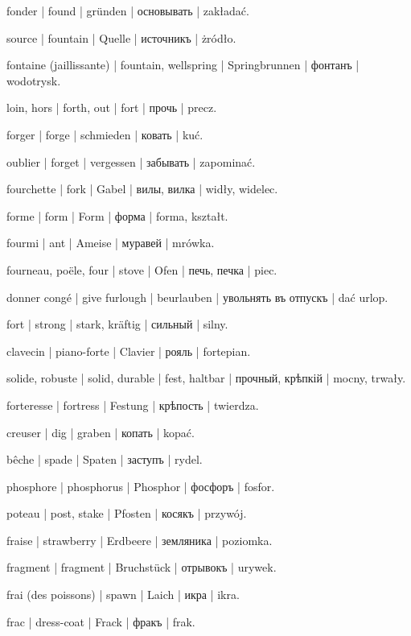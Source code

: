\begin{outdent}{1em}
fonder | found | gründen | основывать | zakładać.

source | fountain | Quelle | источникъ | żródło.

fontaine (jaillissante) | fountain, wellspring | Springbrunnen | фонтанъ | wodotrysk.

loin, hors | forth, out | fort | прочь | precz.

forger | forge | schmieden | ковать | kuć.

oublier | forget | vergessen | забывать | zapominać.

fourchette | fork | Gabel | вилы, вилка | widły, widelec.

forme | form | Form | форма | forma, kształt.

fourmi | ant | Ameise | муравей | mrówka.

fourneau, poële, four | stove | Ofen | печь, печка | piec.

donner congé | give furlough | beurlauben | увольнять въ
отпускъ | dać urlop.

fort | strong | stark, kräftig | сильный | silny.

clavecin | piano-forte | Clavier | рояль | fortepian.

solide, robuste | solid, durable | fest, haltbar | прочный,
крѣпкій | mocny, trwały.

\uvsubentry{}
forteresse | fortress | Festung | крѣпость | twierdza.

creuser | dig | graben | копать | kopać.

\uvsubentry{}
bêche | spade | Spaten | заступъ | rydel.

phosphore | phosphorus | Phosphor | фосфоръ | fosfor.

poteau | post, stake | Pfosten | косякъ | przywój.

fraise | strawberry | Erdbeere | земляника | poziomka.

fragment | fragment | Bruchstück | отрывокъ | urywek.

frai (des poissons) | spawn | Laich | икра | ikra.

frac | dress-coat | Frack | фракъ | frak.


\end{outdent}

